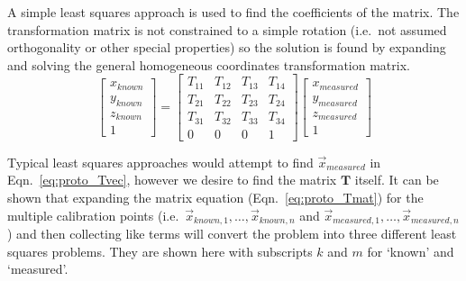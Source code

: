 A simple least squares approach is used to find the coefficients of the matrix. %
The transformation matrix is not constrained to a simple rotation (i.e.\ not assumed orthogonality or other special properties) so the solution is found by expanding and solving the general homogeneous coordinates transformation matrix.
\begin{equation}
    \begin{bmatrix}
        x_{known} \\
        y_{known} \\
        z_{known} \\
        1
    \end{bmatrix} =
    \begin{bmatrix}
        T_{11} & T_{12} & T_{13} &T_{14} \\
        T_{21} & T_{22} & T_{23} &T_{24} \\
        T_{31} & T_{32} & T_{33} &T_{34} \\
        0 & 0 & 0 & 1
    \end{bmatrix}
    \begin{bmatrix}
        x_{measured} \\
        y_{measured} \\
        z_{measured} \\
        1
    \end{bmatrix}
    \label{eq:proto_Tmat}
\end{equation}

Typical least squares approaches would attempt to find $\vec{x}_{measured}$ in Eqn.\ \ref{eq:proto_Tvec}, however we desire to find the matrix $\mathbf{T}$ itself.
It can be shown that expanding the matrix equation (Eqn.\ \ref{eq:proto_Tmat}) for the multiple calibration points (i.e.\ $\vec{x}_{known,1},\dots,\vec{x}_{known,n}$ and $\vec{x}_{measured,1},\dots,\vec{x}_{measured,n}$) and then collecting like terms will convert the problem into three different least squares problems.
They are shown here with subscripts $k$ and $m$ for `known' and `measured'.

